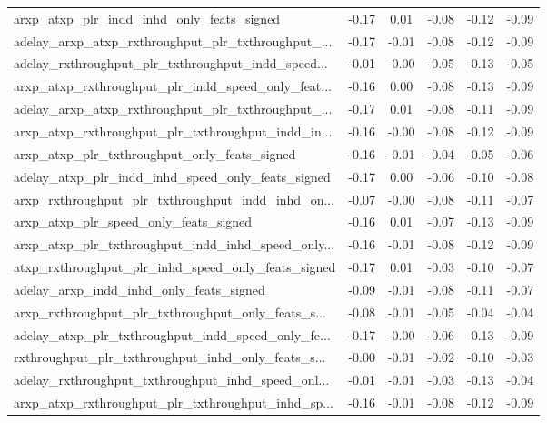 \begin{tabular}{|l|*{4}{c}|r|}
arxp\_atxp\_plr\_indd\_inhd\_only\_feats\_signed          & -0.17 &  0.01 &   -0.08 &      -0.12 & -0.09 \\
adelay\_arxp\_atxp\_rxthroughput\_plr\_txthroughput\_... & -0.17 & -0.01 &   -0.08 &      -0.12 & -0.09 \\
adelay\_rxthroughput\_plr\_txthroughput\_indd\_speed... & -0.01 & -0.00 &   -0.05 &      -0.13 & -0.05 \\
arxp\_atxp\_rxthroughput\_plr\_indd\_speed\_only\_feat... & -0.16 &  0.00 &   -0.08 &      -0.13 & -0.09 \\
adelay\_arxp\_atxp\_rxthroughput\_plr\_txthroughput\_... & -0.17 &  0.01 &   -0.08 &      -0.11 & -0.09 \\
arxp\_atxp\_rxthroughput\_plr\_txthroughput\_indd\_in... & -0.16 & -0.00 &   -0.08 &      -0.12 & -0.09 \\
arxp\_atxp\_plr\_txthroughput\_only\_feats\_signed       & -0.16 & -0.01 &   -0.04 &      -0.05 & -0.06 \\
adelay\_atxp\_plr\_indd\_inhd\_speed\_only\_feats\_signed  & -0.17 &  0.00 &   -0.06 &      -0.10 & -0.08 \\
arxp\_rxthroughput\_plr\_txthroughput\_indd\_inhd\_on... & -0.07 & -0.00 &   -0.08 &      -0.11 & -0.07 \\
arxp\_atxp\_plr\_speed\_only\_feats\_signed              & -0.16 &  0.01 &   -0.07 &      -0.13 & -0.09 \\
arxp\_atxp\_plr\_txthroughput\_indd\_inhd\_speed\_only... & -0.16 & -0.01 &   -0.08 &      -0.12 & -0.09 \\
atxp\_rxthroughput\_plr\_inhd\_speed\_only\_feats\_signed & -0.17 &  0.01 &   -0.03 &      -0.10 & -0.07 \\
adelay\_arxp\_indd\_inhd\_only\_feats\_signed            & -0.09 & -0.01 &   -0.08 &      -0.11 & -0.07 \\
arxp\_rxthroughput\_plr\_txthroughput\_only\_feats\_s... & -0.08 & -0.01 &   -0.05 &      -0.04 & -0.04 \\
adelay\_atxp\_plr\_txthroughput\_indd\_speed\_only\_fe... & -0.17 & -0.00 &   -0.06 &      -0.13 & -0.09 \\
rxthroughput\_plr\_txthroughput\_inhd\_only\_feats\_s... & -0.00 & -0.01 &   -0.02 &      -0.10 & -0.03 \\
adelay\_rxthroughput\_txthroughput\_inhd\_speed\_onl... & -0.01 & -0.01 &   -0.03 &      -0.13 & -0.04 \\
arxp\_atxp\_rxthroughput\_plr\_txthroughput\_inhd\_sp... & -0.16 & -0.01 &   -0.08 &      -0.12 & -0.09 \\

\end{tabular}
